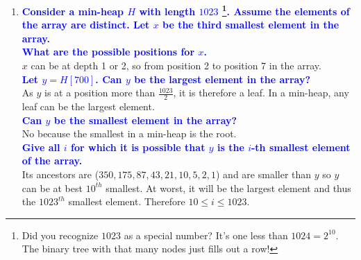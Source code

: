 \documentclass[11pt]{article}
\begin{document}
\begin{enumerate}
\item \textbf{\textcolor{blue}{Consider a min-heap $H$ with length $1023$ \footnote{Did you recognize $1023$ as a special number? It's one less than $1024=2^{10}$. The binary tree with that many nodes just fills out a row!}. Assume the elements of the array are distinct. Let $x$ be the third smallest element in the array.}}
\\ \textbf{\textcolor{blue}{What are the possible positions for $x$.}}
    \\ $x$ can be at depth 1 or 2, so from position 2 to position 7 in the array.
\\ \textbf{\textcolor{blue}{Let $y=H[700]$. Can $y$ be the largest element in the array?}}
    \\ As $y$ is at a position more than $\frac{1023}{2}$, it is therefore a leaf. In a min-heap, any leaf can be the largest element.
\\ \textbf{\textcolor{blue}{Can $y$ be the smallest element in the array?}}
    \\ No because the smallest in a min-heap is the root.
\\ \textbf{\textcolor{blue}{Give all $i$ for which it is possible that $y$ is the $i$-th smallest element of the array.}}
    \\ Its ancestors are ($350,175,87,43,21,10,5,2,1$) and are smaller than $y$ so $y$ can be at best $10^{th}$ smallest. At worst, it will be the largest element and thus the $1023^{th}$ smallest element. Therefore $10 \leq i \leq 1023$.


\end{enumerate}
\end{document}
